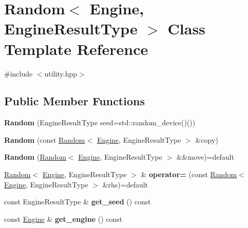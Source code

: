 \hypertarget{class_random}{}\section{Random$<$ Engine, Engine\+Result\+Type $>$ Class Template Reference}
\label{class_random}


{\ttfamily \#include $<$utility.\+hpp$>$}

\subsection*{Public Member Functions}
\begin{DoxyCompactItemize}
\item 
\mbox{\label{class_random_a967417175cc6b2aeee5929f2ea0b178b}} 
{\bfseries Random} (Engine\+Result\+Type seed=std\+::random\+\_\+device()())
\item 
\mbox{\label{class_random_abad8ddc1eb952a48a43c0052aa6d280a}} 
{\bfseries Random} (const \mbox{\hyperlink{class_random}{Random}}$<$ \mbox{\hyperlink{class_engine}{Engine}}, Engine\+Result\+Type $>$ \&copy)
\item 
\mbox{\label{class_random_a4381b61f875c2e4746a81fbb967fe667}} 
{\bfseries Random} (\mbox{\hyperlink{class_random}{Random}}$<$ \mbox{\hyperlink{class_engine}{Engine}}, Engine\+Result\+Type $>$ \&\&move)=default
\item 
\mbox{\label{class_random_a6d2426ffc2369fb7557df8f91a5cf886}} 
\mbox{\hyperlink{class_random}{Random}}$<$ \mbox{\hyperlink{class_engine}{Engine}}, Engine\+Result\+Type $>$ \& {\bfseries operator=} (const \mbox{\hyperlink{class_random}{Random}}$<$ \mbox{\hyperlink{class_engine}{Engine}}, Engine\+Result\+Type $>$ \&rhs)=default
\item 
\mbox{\label{class_random_a1b2ab3fa0602117a6aafa30a7559298c}} 
const Engine\+Result\+Type \& {\bfseries get\+\_\+seed} () const
\item 
\mbox{\label{class_random_a2e7baf19ffba29292bba0f7293d02ec3}} 
const \mbox{\hyperlink{class_engine}{Engine}} \& {\bfseries get\+\_\+engine} () const
\item 

\end{DoxyCompactItemize}

